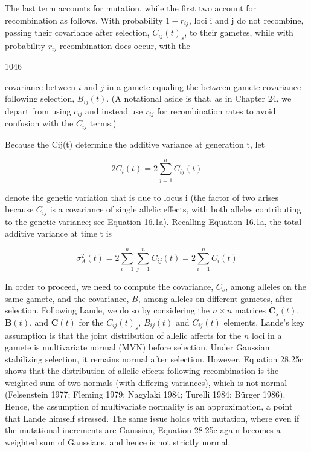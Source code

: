 \documentclass{article}
\begin{document}
The last term accounts for mutation, while the first two account for recombination as follows. With probability  $ 1 - r_{ij} $, loci i and j do not recombine, passing their covariance after selection,  $ C_{ij}(t)_s $, to their gametes, while with probability  $ r_{ij} $ recombination does occur, with the

1046

covariance between $i$ and $j$ in a gamete equaling the between-gamete covariance following selection, $B_{ij}(t)$. (A notational aside is that, as in Chapter 24, we depart from using $c_{ij}$ and instead use $r_{ij}$ for recombination rates to avoid confusion with the $C_{ij}$ terms.)

Because the Cij(t) determine the additive variance at generation t, let

\begin{equation}
2C_{i}(t)=2\sum_{j=1}^{n}C_{ij}(t)
\tag{28.25d}
\label{eq:28_25d}
\end{equation}

denote the genetic variation that is due to locus i (the factor of two arises because  $ C_{ij} $ is a covariance of single allelic effects, with both alleles contributing to the genetic variance; see Equation 16.1a). Recalling Equation 16.1a, the total additive variance at time t is

\begin{equation}
\sigma_{A}^{2}(t)=2\sum_{i=1}^{n}\sum_{j=1}^{n}C_{ij}(t)=2\sum_{i=1}^{n}C_{i}(t)
\tag{28.25e}
\label{eq:28_25e}
\end{equation}

In order to proceed, we need to compute the covariance,  $ C_s $, among alleles on the same gamete, and the covariance,  $ B $, among alleles on different gametes, after selection. Following Lande, we do so by considering the  $ n \times n $ matrices  $ \mathbf{C}_s(t) $,  $ \mathbf{B}(t) $, and  $ \mathbf{C}(t) $ for the  $ C_{ij}(t)_s $,  $ B_{ij}(t) $ and  $ C_{ij}(t) $ elements. Lande's key assumption is that the joint distribution of allelic affects for the  $ n $ loci in a gamete is multivariate normal (MVN) before selection. Under Gaussian stabilizing selection, it remains normal after selection. However, Equation 28.25c shows that the distribution of allelic effects following recombination is the weighted sum of two normals (with differing variances), which is not normal (Felsenstein 1977; Fleming 1979; Nagylaki 1984; Turelli 1984; Bürger 1986). Hence, the assumption of multivariate normality is an approximation, a point that Lande himself stressed. The same issue holds with mutation, where even if the mutational increments are Gaussian, Equation 28.25c again becomes a weighted sum of Gaussians, and hence is not strictly normal.
\end{document}
